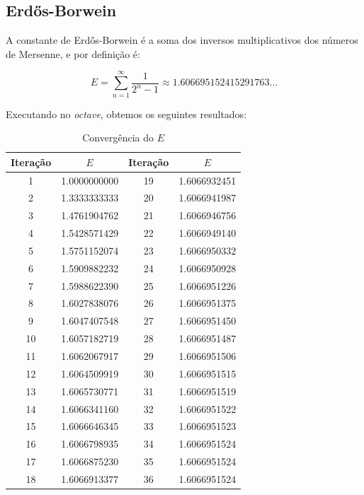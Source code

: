 \documentclass[a4paper]{article}
\begin{document}
\subsection{Erdős-Borwein}

A constante de Erdős-Borwein é a soma dos inversos multiplicativos dos números
de Mersenne, e por definição é:

\begin{equation}
	E = \displaystyle\sum_{n=1}^{\infty} \frac{1}{2^n-1} \approx 1.606695152415291763\dots
\end{equation}

Executando no \emph{octave}, obtemos os seguintes resultados:

\begin{table}[H]
	\centering
	\begin{tabular}{|c|c|c|c|}
    	\hline
		Iteração & $E$ & Iteração & $E$ \\
    	\hline
		1 & 1.0000000000 & 19 & 1.6066932451 \\
    	\hline
		2 & 1.3333333333 & 20 & 1.6066941987 \\
    	\hline
		3 & 1.4761904762 & 21 & 1.6066946756 \\
    	\hline
		4 & 1.5428571429 & 22 & 1.6066949140 \\
    	\hline
		5 & 1.5751152074 & 23 & 1.6066950332 \\
    	\hline
		6 & 1.5909882232 & 24 & 1.6066950928 \\
    	\hline
		7 & 1.5988622390 & 25 & 1.6066951226 \\
    	\hline
		8 & 1.6027838076 & 26 & 1.6066951375 \\
    	\hline
		9 & 1.6047407548 & 27 & 1.6066951450 \\
    	\hline
		10 & 1.6057182719 & 28 & 1.6066951487 \\
    	\hline
		11 & 1.6062067917 & 29 & 1.6066951506 \\
    	\hline
		12 & 1.6064509919 & 30 & 1.6066951515 \\
    	\hline
		13 & 1.6065730771 & 31 & 1.6066951519 \\
    	\hline
		14 & 1.6066341160 & 32 & 1.6066951522 \\
    	\hline
		15 & 1.6066646345 & 33 & 1.6066951523 \\
    	\hline
		16 & 1.6066798935 & 34 & 1.6066951524 \\
    	\hline
		17 & 1.6066875230 & 35 & 1.6066951524 \\
    	\hline
		18 & 1.6066913377 & 36 & 1.6066951524 \\
    	\hline
	\end{tabular}
	\label{erdos_table}
	\caption{Convergência do $E$}
\end{table}
\end{document}

